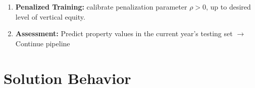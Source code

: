 \documentclass[aspectratio=169,10pt]{beamer}
\begin{document}
\begin{frame}{\frameG}
\begin{block}{ }
\begin{enumerate}
    \item \textbf{Penalized Training:} calibrate penalization parameter $\rho>0$, up to desired level of vertical equity.
    \item \textbf{Assessment:} Predict property values in the current year's testing set $\rightarrow$ Continue pipeline
\end{enumerate}
    \end{block}
\end{frame}






\newcommand{\sectionD}{Solution Behavior}
\section{\sectionD}
\end{document}
